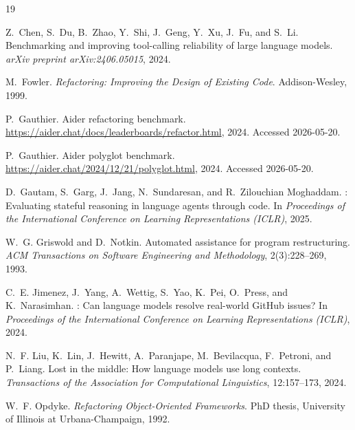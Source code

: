 \documentclass[11pt,letterpaper]{article}
\begin{document}
\begin{thebibliography}{19}

Z.~Chen, S.~Du, B.~Zhao, Y.~Shi, J.~Geng, Y.~Xu, J.~Fu, and S.~Li.
\newblock Benchmarking and improving tool-calling reliability of large language models.
\newblock \emph{arXiv preprint arXiv:2406.05015}, 2024.

M.~Fowler.
\newblock \emph{Refactoring: Improving the Design of Existing Code}.
\newblock Addison-Wesley, 1999.

P.~Gauthier.
\newblock Aider refactoring benchmark.
\newblock \url{https://aider.chat/docs/leaderboards/refactor.html}, 2024. Accessed 2026-05-20.

P.~Gauthier.
\newblock Aider polyglot benchmark.
\newblock \url{https://aider.chat/2024/12/21/polyglot.html}, 2024. Accessed 2026-05-20.

D.~Gautam, S.~Garg, J.~Jang, N.~Sundaresan, and R.~Zilouchian Moghaddam.
: Evaluating stateful reasoning in language agents through code.
\newblock In \emph{Proceedings of the International Conference on Learning Representations (ICLR)}, 2025.

W.~G. Griswold and D.~Notkin.
\newblock Automated assistance for program restructuring.
\newblock \emph{ACM Transactions on Software Engineering and Methodology}, 2(3):228--269, 1993.

C.~E. Jimenez, J.~Yang, A.~Wettig, S.~Yao, K.~Pei, O.~Press, and K.~Narasimhan.
: Can language models resolve real-world {GitHub} issues?
\newblock In \emph{Proceedings of the International Conference on Learning Representations (ICLR)}, 2024.

N.~F. Liu, K.~Lin, J.~Hewitt, A.~Paranjape, M.~Bevilacqua, F.~Petroni, and P.~Liang.
\newblock Lost in the middle: How language models use long contexts.
\newblock \emph{Transactions of the Association for Computational Linguistics}, 12:157--173, 2024.

W.~F. Opdyke.
\newblock \emph{Refactoring Object-Oriented Frameworks}.
\newblock PhD thesis, University of Illinois at Urbana-Champaign, 1992.


\end{thebibliography}
\end{document}
